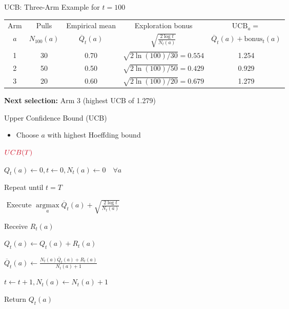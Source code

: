 \documentclass[11pt,table]{beamer}
\begin{document}
\begin{frame}{UCB: Three-Arm Example for $t = 100$}
\footnotesize
  \begin{table}[h]
    \centering
    \begin{tabular}{c c c c c}
      \toprule
      Arm & Pulls & Empirical mean  & Exploration bonus & $\mathrm{UCB}_a =$ \\
      $a$ & $N_{100}(a)$ & $\overline{Q}_t(a)$ & $\displaystyle \sqrt{\frac{2 \log t}{N_t(a)}}$ & $\overline{Q}_t(a) + \text{bonus}_t(a)$ \\
      \midrule
      1 & 30 & 0.70 & $\sqrt{2\ln(100)/30}=0.554$ & 1.254 \\
      2 & 50 & 0.50 & $\sqrt{2\ln(100)/50}=0.429$ & 0.929 \\
      3 & 20 & 0.60 & $\sqrt{2\ln(100)/20}=0.679$ & 1.279 \\
      \bottomrule
    \end{tabular}
  \end{table}

  \vspace{1em}
  \textbf{Next selection:} Arm 3 (highest UCB of 1.279)
\end{frame}


\begin{frame}{Upper Confidence Bound (UCB)}
    \begin{itemize}
			\item  Choose $a$ with highest Hoeffding bound 
    \end{itemize}

\begin{tcolorbox}[colframe=black, boxrule=1pt, sharp corners]
$\textcolor{red1}{UCB(T)}$

\quad$
Q_t(a) \leftarrow 0, t \leftarrow 0, N_t(a) \leftarrow 0 \quad \forall a
$

\quad Repeat until $t=T$

\qquad$
\text { Execute } \underset{a}{\operatorname{argmax}} \overline{Q}_t(a)+\sqrt{\frac{2 \log t}{N_t(a)}}
$

\qquad Receive $R_t(a)$

\qquad $
Q_t(a) \leftarrow Q_t(a)+R_t(a)
$

\qquad $\overline{Q}_t(a) \leftarrow \frac{N_t(a) \overline{Q}_t(a)+R_t(a)}{N_t(a) +1}$

\qquad $t \leftarrow t+1, N_t(a) \leftarrow N_t(a)+1$

Return $Q_t(a)$

\end{tcolorbox}
    
\end{frame}
\end{document}
